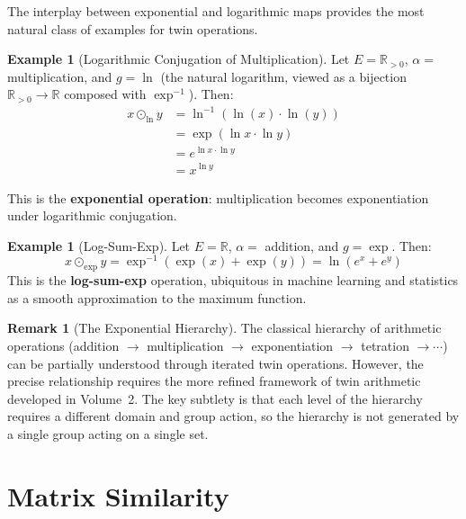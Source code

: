 \documentclass[11pt,a4paper,openany]{book}
\theoremstyle{plain}
\theoremstyle{definition}
\newtheorem{example}[theorem]{Example}
\newtheorem{remark}[theorem]{Remark}
\newcommand{\twing}[1]{\odot_{#1}}
\newcommand{\actspace}{E}
\newcommand{\RR}{\mathbb{R}}
\DeclareMathOperator{\Exp}{exp}
\DeclareMathOperator{\Log}{ln}
\begin{document}
The interplay between exponential and logarithmic maps provides the most natural class of examples for twin operations.

\begin{example}[Logarithmic Conjugation of Multiplication]\label{ex:exp-log}
Let $\actspace = \RR_{>0}$, $\alpha = $ multiplication, and $g = \Log$ (the natural logarithm, viewed as a bijection $\RR_{>0} \to \RR$ composed with $\Exp^{-1}$). Then:
\begin{align*}
x \twing{\Log} y &= \Log^{-1}(\Log(x) \cdot \Log(y)) \\
&= \Exp(\ln x \cdot \ln y) \\
&= e^{\ln x \cdot \ln y} \\
&= x^{\ln y}
\end{align*}

This is the \textbf{exponential operation}: multiplication becomes exponentiation under logarithmic conjugation.
\end{example}

\begin{example}[Log-Sum-Exp]\label{ex:logsumexp}
Let $\actspace = \RR$, $\alpha = $ addition, and $g = \Exp$. Then:
\[
x \twing{\Exp} y = \Exp^{-1}(\Exp(x) + \Exp(y)) = \ln(e^x + e^y)
\]
This is the \textbf{log-sum-exp} operation, ubiquitous in machine learning and statistics as a smooth approximation to the maximum function.
\end{example}

\begin{remark}[The Exponential Hierarchy]
The classical hierarchy of arithmetic operations (addition $\to$ multiplication $\to$ exponentiation $\to$ tetration $\to \cdots$) can be partially understood through iterated twin operations. However, the precise relationship requires the more refined framework of twin arithmetic developed in Volume~2. The key subtlety is that each level of the hierarchy requires a different domain and group action, so the hierarchy is not generated by a single group acting on a single set.
\end{remark}

\section{Matrix Similarity}\label{sec:ex-matrix}
\end{document}
